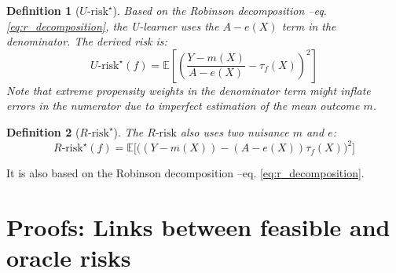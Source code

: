 \documentclass[11pt]{article}
\let\cite=\supercite
\newtheorem{definition}{Definition}
\begin{document}
\begin{appendices}
    \begin{definition}[$U\text{-risk}^{\star}$]\label{def:u_risk}
        \cite{kunzel_metalearners_2019,nie_quasioracle_2017} Based on
        the Robinson decomposition --eq. \ref{eq:r_decomposition}, the U-learner
        uses the $A-e(X)$ term
        in the denominator. The derived risk is:
        \begin{equation*}
            U\text{-risk}^{\star}(f) =\mathbb{E}
            \left[
                \left( \frac{Y-m\left(X\right)}{A-e\left(X\right)} -
                \tau_f\left(X\right)\right)^{2} \right]
        \end{equation*}
        Note that extreme propensity weights in the
        denominator term might inflate errors in the numerator due to imperfect
        estimation of the mean outcome $m$.
    \end{definition}

    \begin{definition}[$R\text{-risk}^{\star}$]\label{def:r_risk}
        \cite{nie_quasioracle_2017,schuler_comparison_2018}
        The $R\text{-risk}$ also uses two nuisance $m$ and $e$:
        \begin{equation*}
            R\text{-risk}^{\star}(f) =\mathbb{E} \big[
                \big(\left(Y-m\left(X\right)\right) -\left(A-e\left(X\right)\right) \tau_f\left(X\right)\big)^{2} \big]
        \end{equation*}
    \end{definition}

    It is also based on the Robinson decomposition --eq. \ref{eq:r_decomposition}. %

    \section{Proofs: Links between feasible and oracle risks}\label{apd:proofs}




\end{appendices}
\end{document}
